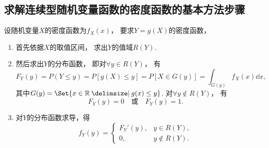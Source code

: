 \subsection{求解连续型随机变量函数的密度函数的基本方法步骤}
设随机变量\(X\)的密度函数为\(f_X(x)\)，
要求\(Y = g(X)\)的密度函数，
\begin{enumerate}
	\item 首先依据\(X\)的取值区间，
	求出\(Y\)的值域\(R(Y)\).

	\item 然后求出\(Y\)的分布函数，
	即对\(\forall y \in R(Y)\)，
	有\[
		F_Y(y) = P(Y \leq y)
		= P[g(X) \leq y]
		= P[X \in G(y)]
		= \int_{G(y)} f_X(x) \dd{x},
	\]
	其中\(G(y) = \Set{ x\in\mathbb{R} \given g(x) \leq y }\).
	对\(\forall y \notin R(Y)\)，
	有\[
		F_Y(y) = 0
		\quad\text{或}\quad
		F_Y(y) = 1.
	\]

	\item 对\(Y\)的分布函数求导，得\[
		f_Y(y) = \left\{ \begin{array}{cl}
			F_Y'(y), & y \in R(Y), \\
			0, & y \notin R(Y).
		\end{array} \right.
	\]
\end{enumerate}
